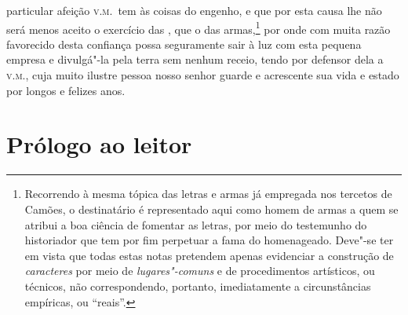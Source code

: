 particular afeição \textsc{v.m.}~tem às coisas do engenho, e que por esta causa		%
lhe não será menos aceito o exercício das , que o das
armas,\footnote{ Recorrendo à mesma tópica das letras e armas já
empregada nos tercetos de Camões, o destinatário  é representado aqui
como homem de armas a quem se atribui a boa ciência de fomentar as
letras, por meio do testemunho do historiador que tem por fim perpetuar
a fama do homenageado. Deve"-se ter em vista que todas estas notas
pretendem apenas evidenciar a construção de \textit{caracteres} por
meio de \textit{lugares"-comuns} e de procedimentos artísticos, ou
técnicos, não correspondendo, portanto, imediatamente a circunstâncias
empíricas, ou ``reais''.} por onde com muita
razão favorecido desta confiança possa seguramente sair à luz com esta
pequena empresa e divulgá"-la pela terra sem nenhum receio, tendo por
defensor dela a \textsc{v.m.}, cuja muito ilustre pessoa nosso senhor guarde e
acrescente sua vida e estado por longos e felizes anos. 



\chapter[Prólogo ao leitor]{Prólogo ao leitor}



